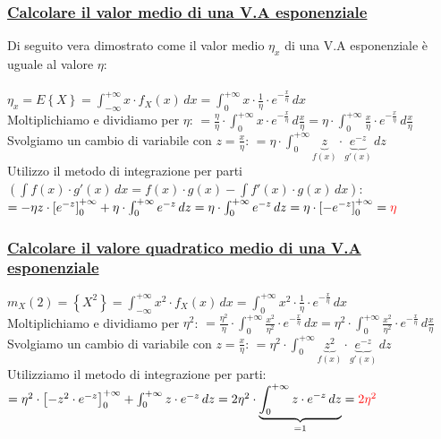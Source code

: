 \documentclass{article}
\begin{document}
\subsubsection{\underline{Calcolare il valor medio di una V.A esponenziale}}
Di seguito vera dimostrato come il valor medio $\eta_x$ di una V.A esponenziale è uguale al valore $\eta$: \\ \\
$\eta_x = E \left\{X\right\} = \int_{-\infty}^{+\infty} x \cdot f_X(x) \,dx = \int_{0}^{+\infty} x \cdot \frac 1 \eta \cdot e^{-\frac x \eta} \,dx$ \\
Moltiplichiamo e dividiamo per $\eta$: $= \frac \eta \eta \cdot \int_{0}^{+\infty} x \cdot e^{- \frac x \eta } \,d\frac x \eta = \eta \cdot \int_{0}^{+\infty} \frac x \eta \cdot e^{- \frac x \eta } \,d\frac x \eta$ \\
Svolgiamo un cambio di variabile con $z = \frac x \eta$: $= \eta \cdot \int_{0}^{+\infty} \underset{f(x)}{\underbrace{z}} \cdot \underset{g'(x)}{\underbrace{e^{- z }}} \,dz$ \\
Utilizzo il metodo di integrazione per parti $\left(  \int f(x) \cdot g'(x) \,dx = f(x) \cdot g(x) - \int f'(x) \cdot g(x) \,dx \right)$: \\
$= - \eta  z \cdot \left[ e^{-z} \right]_0^{+\infty} + \eta \cdot \int_{0}^{+\infty} e^{-z} \,dz = \eta \cdot \int_{0}^{+\infty} e^{-z} \,dz = \eta \cdot \left[- e^{-z} \right]_0^{+\infty} = \color{red} \eta$
\subsubsection{\underline{Calcolare il valore quadratico medio di una V.A esponenziale}}
$m_X(2) = \left\{ X^2 \right\} = \int_{-\infty}^{+\infty} x^2 \cdot f_X(x) \,dx = \int_{0}^{+\infty} x^2 \cdot \frac 1 \eta \cdot e^{-\frac x \eta} \,dx$ \\
Moltiplichiamo e dividiamo per $\eta^2$: $= \frac{\eta^2}{\eta} \cdot \int_{0}^{+\infty} \frac{x^{2}}{\eta^2} \cdot e^{-\frac x \eta} \,dx =
\eta^2 \cdot \int_{0}^{+\infty} \frac{x^{2}}{\eta^2} \cdot e^{-\frac x \eta} \,d \frac x \eta$ \\
Svolgiamo un cambio di variabile con $z = \frac x \eta$: $= \eta^2 \cdot \int_{0}^{+\infty} \underset{f(x)}{\underbrace{z^2}} \cdot \underset{g'(x)}{\underbrace{e^{-z}}} \,dz$ \\
Utilizziamo il metodo di integrazione per parti: \\
$= \eta^2 \cdot \left[ -z^2 \cdot e^{-z} \right]_0^{+\infty} + \int_{0}^{+\infty} z \cdot e^{-z} \,dz = 2\eta^2 \cdot \underset{=1}{\underbrace{\int_{0}^{+\infty} z \cdot e^{-z} \,dz}} = \color{red} 2\eta^2$
\end{document}
